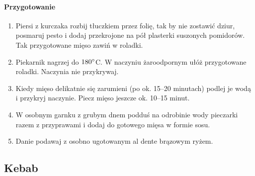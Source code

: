 \documentclass{article}
\begin{document}
    \paragraph{Przygotowanie}
    \begin{enumerate}
        \item Piersi z kurczaka rozbij tłuczkiem przez folię, tak by nie
            zostawić dziur, posmaruj pesto i dodaj przekrojone na pół plasterki
            suszonych pomidorów. Tak przygotowane mięso zawiń w roladki.
        \item Piekarnik nagrzej do $180\degree$C. W naczyniu żaroodpornym ułóż
            przygotowane roladki. Naczynia nie przykrywaj.
        \item Kiedy mięso delikatnie się zarumieni (po ok. 15–20 minutach)
            podlej je wodą i przykryj naczynie. Piecz mięso jeszcze ok. 10–15
            minut.
        \item W osobnym garnku z grubym dnem podduś na odrobinie wody pieczarki
            razem z przyprawami i dodaj do gotowego mięsa w formie sosu.
        \item Danie podawaj z osobno ugotowanym al dente brązowym ryżem.
    \end{enumerate}
    \newpage


    \subsection{Kebab}
    \bigskip
\end{document}
